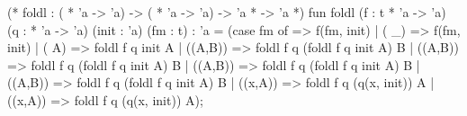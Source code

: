 \nwenddocs{}\endmoddef\nwstartdeflinemarkup{}\nwenddeflinemarkup
(* foldl : ( * 'a -> 'a) -> ( * 'a -> 'a) -> 'a *  -> 'a *)
fun foldl (f : t * 'a -> 'a) (q :  * 'a -> 'a) (init : 'a) (fm : t) : 'a =
  (case fm of
     => f(fm, init)
  | ( _) => f(fm, init)
  | ( A) => foldl f q init A 
  | ((A,B)) => foldl f q (foldl f q init A) B
  | ((A,B)) => foldl f q (foldl f q init A) B
  | ((A,B)) => foldl f q (foldl f q init A) B
  | ((A,B)) => foldl f q (foldl f q init A) B
  | ((x,A)) => foldl f q (q(x, init)) A
  | ((x,A)) => foldl f q (q(x, init)) A);

